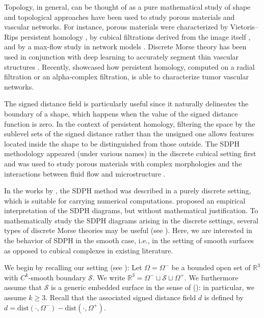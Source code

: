 \documentclass[11pt]{article}
\newcommand{\R}{\mathbb{R}}
\newcommand{\W}{\Omega}
\newcommand{\dist}{\mathrm{dist}}
\newcommand{\Surf}{\mathcal{S}}
\theoremstyle{plain}
\theoremstyle{definition}
\theoremstyle{remark}
\begin{document}
Topology, in general, can be thought of as a pure mathematical study of shape and topological approaches have been used to study porous materials and vascular networks. For instance, porous materials were characterized by Vietoris--Rips persistent homology \citep{lee_quantifying_2017, obayashi_persistent_2022}, by cubical filtrations derived from the image itself \citep{robins_theory_2011}, and by a max-flow study in network models \citep{armstrong_correspondence_2021}. Discrete Morse theory has been used in conjunction with deep learning to accurately segment thin vascular structures \citep{hu_topology-preserving_2019,hu_learning_2022}.
Recently, \cite{stolz_multiscale_2022} showcased how persistent homology, computed on a radial filtration or an alpha-complex filtration, is able to characterize tumor vascular networks.

The signed distance field is particularly useful since it naturally delineates the boundary of a shape, which happens when the value of the signed distance function is zero.  In the context of persistent homology, filtering the space by the sublevel sets of the signed distance rather than the unsigned one allows features located inside the shape to be distinguished from those outside.  The SDPH methodology appeared (under various names) in the discrete cubical setting first and was used to study porous materials with complex morphologies \citep{delgado-friedrichs_morse_2014, delgado-friedrichs_skeletonization_2015} and the interactions between fluid flow and microstructure \citep{herring_topological_2019, moon_statistical_2019}.

In the works by \cite{delgado-friedrichs_morse_2014, delgado-friedrichs_skeletonization_2015,herring_topological_2019, moon_statistical_2019}, the SDPH method was described in a purely discrete setting, which is suitable for carrying numerical computations. \cite{herring_topological_2019, moon_statistical_2019} proposed an empirical interpretation of the SDPH diagrams, but without mathematical justification. 
To mathematically study the SDPH diagrams arising in the discrete settings, several types of discrete Morse theories may be useful \citep{banchoff_critical_1967, forman_morse_1998} (see \citep{lewiner_critical_2013, bloch_polyhedral_2013, bauer_persistence_2011, saucan_discrete_2020}).
Here, we are interested in the behavior of SDPH in the smooth case, i.e., in the setting of smooth surfaces as opposed to cubical complexes in existing literature. 

We begin by recalling our setting (see ): Let $\W = \W^-$ be a bounded open set of $\R^3$ with $C^k$-smooth boundary $\Surf$. We write $\R^3 = \W^- \sqcup \Surf \sqcup \W^+$. We furthermore assume that $\Surf$ is a generic embedded surface in the sense of  (): in particular, we assume $k \geq 3$. Recall that the associated signed distance field $d$ is defined by $d = \dist(\cdot, \W^-) - \dist(\cdot, \W^+)$.
\end{document}
